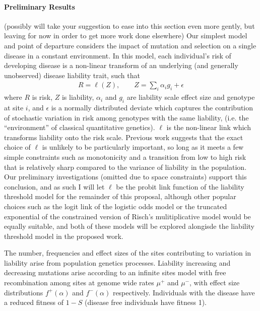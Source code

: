 \documentclass[11pt]{article}
\newcommand{\jb}[1]{{\color{blue} (#1)} }
\begin{document}
\paragraph{Preliminary Results}
\jb{possibly will take your suggestion to ease into this section even more gently, but leaving for now in order to get more work done elsewhere}
Our simplest model and point of departure considers the impact of mutation and selection on a single disease in a constant environment. In this model, each individual's risk of developing disease is a non-linear transform of an underlying (and generally unobserved) disease liability trait, such that
\begin{align}
  R=\ell(Z),    \qquad    Z = \sum_{i}\alpha_ig_i + \epsilon
\end{align}
where $R$ is risk, $Z$ is liability, $\alpha_i$ and $g_i$ are liability scale effect size and genotype at site $i$, and $\epsilon$ is a normally distributed deviate  which captures the contribution of stochastic variation in risk among genotypes with the same liability, (i.e. the ``environment'' of classical quantitative genetics). $\ell$ is the non-linear link which transforms liability onto the risk scale. Previous work \cite{Slatkin:2008hw, Wray:2010ir} suggests that the exact choice of $\ell$ is unlikely to be particularly important, so long as it meets a few simple constraints such as monotonicity and a transition from low to high risk that is relatively sharp compared to the variance of liability in the population. Our preliminary investigations (omitted due to space constraints) support this conclusion, and as such I will let $\ell$ be the probit link function of the liability threshold model for the remainder of this proposal, although other popular choices such as the logit link of the logistic odds model or the truncated exponential of the constrained version of Risch's mulitiplicative model \cite{Wray:2010ir,Risch:1990ty} would be equally suitable, and both of these models will be explored alongisde the liability threshold model in the proposed work. 

The number, frequencies and effect sizes of the sites contributing to variation in liability arise from population genetics processes. Liability increasing and decreasing mutations arise according to an infinite sites model with free recombination among sites at genome wide rates $\mu^+$ and $\mu^-$, with effect size distributions $f^+\left(\alpha\right)$ and $f^-\left(\alpha\right)$ respectively. Individuals with the disease have a reduced fitness of $1-S$ (disease free individuals have fitness 1).
\end{document}
